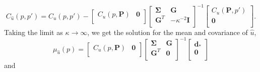 \documentclass[10pt,letter]{article}
\begin{document}
\begin{equation}\label{eq:PosteriorCov2}
C_{\hat{u}}(p,p') = C_u(p,p') - 
                    \left[\begin{array}{cc}
                          C_u(p,\bm{P}) & \bm{0} \\
                          \end{array}\right]
                    \left[\begin{array}{cc}
                          \bm{\Sigma} & \bm{G} \\
                          \bm{G}^T  & -\kappa^{-2} \bm{I} \\
                          \end{array}\right]^{-1}
                    \left[\begin{array}{c}
                          C_u(\bm{P},p') \\
                          \bm{0} \\
                          \end{array}\right].
\end{equation}
Taking the limit as $\kappa \to \infty$, we get the solution for the mean and covariance of $\hat{u}$,
 \begin{equation}\label{eq:PosteriorMean3}
\mu_{\hat{u}}(p) = \left[\begin{array}{cc}
                         C_u(p,\bm{P}) & \bm{0} \\
                         \end{array}\right]
                   \left[\begin{array}{cc}
                         \bm{\Sigma} & \bm{G} \\
                         \bm{G}^T  & \bm{0} \\
                         \end{array}\right]^{-1}
                   \left[\begin{array}{c}
                         \bm{d}_* \\
                         \bm{0} \\
                         \end{array}\right]
\end{equation}    
and
\end{document}
